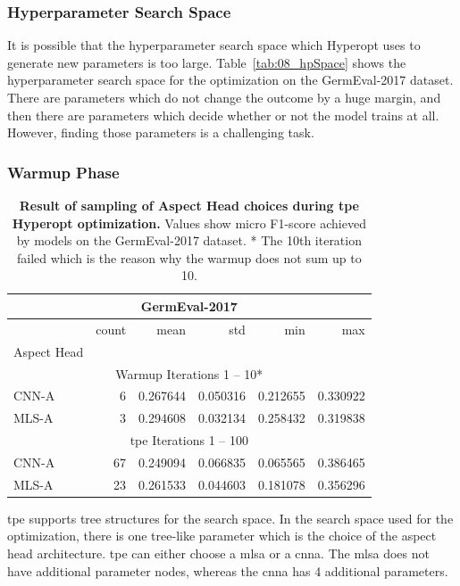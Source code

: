\subsubsection*{Hyperparameter Search Space}

It is possible that the hyperparameter search space which Hyperopt uses to generate new parameters is too large. Table~\ref{tab:08_hpSpace} shows the hyperparameter search space for the optimization on the GermEval-2017 dataset. There are parameters which do not change the outcome by a huge margin, and then there are parameters which decide whether or not the model trains at all. However, finding those parameters is a challenging task.

\subsubsection*{Warmup Phase}
\label{sec:06_hp_warmup}
\begin{table}[]
    \centering
    \begin{tabular}{lrrrrr}
    \multicolumn{6}{c}{GermEval-2017} \\

    \toprule
    {} &  count &      mean &       std &       min &       max \\
    Aspect Head &        &           &           &           &           \\
    \midrule
    \multicolumn{6}{c}{Warmup Iterations 1 -- 10*} \\
    CNN-A    &    6 &  0.267644 &  0.050316 &  0.212655 &  0.330922 \\
    MLS-A    &    3 &  0.294608 &  0.032134 &  0.258432 &  0.319838 \\
    \midrule
    \multicolumn{6}{c}{\gls{tpe} Iterations 1 -- 100} \\
    CNN-A    &   67 &  0.249094 &  0.066835 &  0.065565 &  0.386465 \\
    MLS-A    &   23 &  0.261533 &  0.044603 &  0.181078 &  0.356296 \\
    \bottomrule
    \end{tabular}
    \caption{\textbf{Result of sampling of Aspect Head choices during \gls{tpe} Hyperopt optimization.} Values show micro F1-score achieved by models on the GermEval-2017 dataset. * The 10th iteration failed which is the reason why the warmup does not sum up to 10.}
    \label{tab:08_hpAspectHeadsSpace}    
\end{table}

\gls{tpe} supports tree structures for the search space. In the search space used for the optimization, there is one tree-like parameter which is the choice of the aspect head architecture. \gls{tpe} can either choose a \acrfull{mlsa} or a \acrfull{cnna}. The \gls{mlsa} does not have additional parameter nodes, whereas the \gls{cnna} has 4 additional parameters.
\medskip

